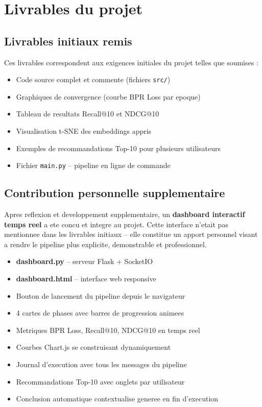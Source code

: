\documentclass[12pt,a4paper]{report}
\begin{document}
\section{Livrables du projet}

\subsection{Livrables initiaux remis}

Ces livrables correspondent aux exigences initiales du projet
telles que soumises :

\begin{itemize}
  \item Code source complet et commente (fichiers \texttt{src/})
  \item Graphiques de convergence (courbe BPR Loss par epoque)
  \item Tableau de resultats Recall@10 et NDCG@10
  \item Visualisation t-SNE des embeddings appris
  \item Exemples de recommandations Top-10 pour plusieurs utilisateurs
  \item Fichier \texttt{main.py} -- pipeline en ligne de commande
\end{itemize}

\subsection{Contribution personnelle supplementaire}

\begin{tcolorbox}[enhanced,colback=enspyorange!8,colframe=enspyorange,
  arc=6pt,boxrule=1.5pt,
  title={\bfseries\small\color{white} Innovation ajoutee -- Dashboard Temps Reel},
  colbacktitle=enspyorange]
Apres reflexion et developpement supplementaire, un
\textbf{dashboard interactif temps reel} a ete concu et
integre au projet. Cette interface n'etait pas mentionnee
dans les livrables initiaux -- elle constitue un apport
personnel visant a rendre le pipeline plus explicite,
demonstrable et professionnel.
\end{tcolorbox}

\begin{itemize}
  \item \textbf{dashboard.py} -- serveur Flask + SocketIO
  \item \textbf{dashboard.html} -- interface web responsive
  \item Bouton de lancement du pipeline depuis le navigateur
  \item 4 cartes de phases avec barres de progression animees
  \item Metriques BPR Loss, Recall@10, NDCG@10 en temps reel
  \item Courbes Chart.js se construisant dynamiquement
  \item Journal d'execution avec tous les messages du pipeline
  \item Recommandations Top-10 avec onglets par utilisateur
  \item Conclusion automatique contextualise generee en fin d'execution
\end{itemize}
\end{document}
